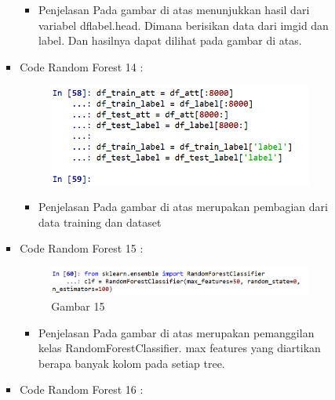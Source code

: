 \begin{enumerate}
\begin{itemize}
\begin{itemize}
\begin{itemize}
\begin{itemize}
\item Penjelasan Pada gambar di atas menunjukkan hasil dari variabel dflabel.head. Dimana berisikan data dari imgid dan label. Dan hasilnya dapat dilihat pada gambar di atas.
\par
\par
\end{itemize}
\item Code Random Forest 14 :
\par
\begin{figure}[ht]
\centering
\includegraphics[scale=0.7]{figures/andi/RF14.PNG}
\label{contoh}
\end{figure}
\par
\begin{itemize}
\item Penjelasan  Pada gambar di atas merupakan pembagian dari data training dan dataset
\par
\par
\end{itemize}
\item Code Random Forest 15 :
\par
\begin{figure}[ht] 
\centering
\includegraphics[scale=0.7]{figures/andi/RF15.PNG}
\caption{Gambar 15}
\label{contoh}
\end{figure}
\par
\begin{itemize} 
\item Penjelasan  Pada gambar di atas merupakan pemanggilan kelas RandomForestClassifier. max features yang diartikan berapa banyak kolom pada setiap tree.
\par
\par
\end{itemize}
\item Code Random Forest 16 :

\end{itemize}
\end{itemize}
\end{itemize}
\end{enumerate}
